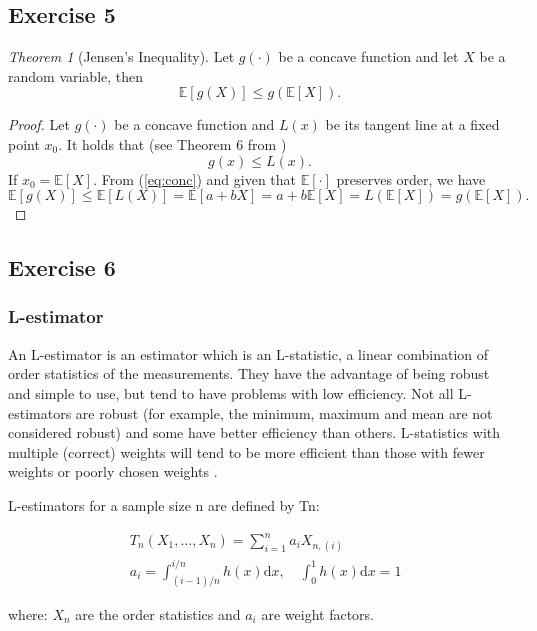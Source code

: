 \documentclass[11pt]{article}
\theoremstyle{definition}
\theoremstyle{remark}
\theoremstyle{remark}
\newtheorem{theorem}{Theorem}[section]
\newcommand{\E}[1]{\mathbb{E}\left[#1 \right]}
\begin{document}
\subsection*{Exercise 5}
\begin{theorem}[Jensen's Inequality]
  Let $g(\cdot)$ be a concave function and let $X$ be a random
  variable, then
\[
  \E{g(X)} \leq g(\E{X}).
\]
\end{theorem}

\begin{proof}
  Let $g(\cdot)$ be a concave function and $L(x)$ be its tangent line
  at a fixed point $x_0$. It holds that (see Theorem 6 from
  \cite{nachbar2018concave})
\begin{equation}\label{eq:conc}
  g(x) \leq L(x).
\end{equation}
If $x_0=\E{X}$. From (\ref{eq:conc}) and given that $\E{\cdot}$
preserves order, we have
\[
  \E{g(X)} \leq \E{L(X)} = \E{a+bX} = a + b\E{X} = L(\E{X}) =
  g(\E{X}).
\]
\end{proof}

\subsection{Exercise 6}

\subsubsection*{ L-estimator }

An L-estimator is an estimator which is an L-statistic, a linear
combination of order statistics of the measurements. They have the
advantage of being robust and simple to use, but tend to have problems
with low efficiency. Not all L-estimators are robust (for example, the
minimum, maximum and mean are not considered robust) and some have
better efficiency than others. L-statistics with multiple (correct)
weights will tend to be more efficient than those with fewer weights
or poorly chosen weights \cite{andersen2008modern}.

L-estimators for a sample size n are defined by Tn:

\begin{align*}
  &T_{n}\left(X_{1}, \ldots, X_{n}\right)=\sum_{i=1}^{n} a_{i} X_{n,(i)}\\
  &a_{i}=\int_{(i-1) / n}^{i / n} h(x) \mathrm{d} x, \quad
  \int_{0}^{1} h(x) \mathrm{d} x=1
\end{align*}

where: $X_{n}$ are the order statistics and $a_{i}$ are weight
factors.
\end{document}
